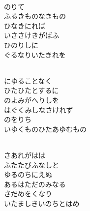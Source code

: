 \documentclass[10pt,b5j]{tarticle} %
\begin{document}
\vspace{1.5em} %
\newcommand{\linespace}{0.5em} %
\newcommand{\blocksize}{0.33\hsize} %
\newcommand{\itemmargin}{3em} %
\begin{enumerate} %
    \setlength{\itemindent}{\itemmargin} %
    \begin{minipage}[c]{\blocksize}
    
        \vspace{\linespace}
        \item~\\
        のりて\\
        ふるきものなきもの\\
        ひなきにれば\\
        いささけきがばふ\\
        ひのりしに\\
        ぐるなりいたきれを
        
        \vspace{\linespace}
        \item~\\
        にゆることなく\\
        ひたひたとするに\\
        のよみがへりしを\\
        はぐくみしなさけれず\\
        のをりち\\
        いゆくものひたあゆむもの
        
    \end{minipage}
    \begin{minipage}[c]{\blocksize}
        
        \vspace{\linespace}
        \item~\\
        さあれがはは\\
        ふたたびふなしと\\
        ゆるのちにえぬ\\
        あるはただのみなる\\
        さだめをくなり\\
        いたましきいのちとはめ
        

\end{minipage}
\end{enumerate}
\end{document}

